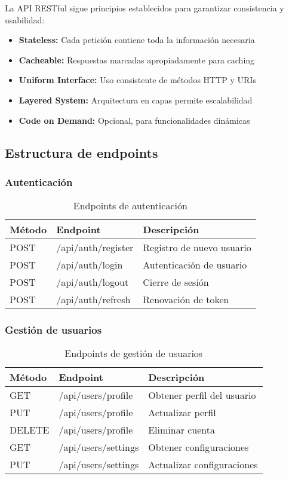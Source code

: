 La API RESTful sigue principios establecidos para garantizar consistencia y usabilidad:

\begin{itemize}
    \item \textbf{Stateless:} Cada petición contiene toda la información necesaria
    \item \textbf{Cacheable:} Respuestas marcadas apropiadamente para caching
    \item \textbf{Uniform Interface:} Uso consistente de métodos HTTP y URIs
    \item \textbf{Layered System:} Arquitectura en capas permite escalabilidad
    \item \textbf{Code on Demand:} Opcional, para funcionalidades dinámicas
\end{itemize}

\subsection{Estructura de endpoints}

\subsubsection{Autenticación}

\begin{table}[H]
\centering
\begin{tabular}{|l|l|l|}
\hline
\textbf{Método} & \textbf{Endpoint} & \textbf{Descripción} \\
\hline
POST & /api/auth/register & Registro de nuevo usuario \\
POST & /api/auth/login & Autenticación de usuario \\
POST & /api/auth/logout & Cierre de sesión \\
POST & /api/auth/refresh & Renovación de token \\
\hline
\end{tabular}
\caption{Endpoints de autenticación}
\label{tab:endpoints_auth}
\end{table}

\subsubsection{Gestión de usuarios}

\begin{table}[H]
\centering
\begin{tabular}{|l|l|l|}
\hline
\textbf{Método} & \textbf{Endpoint} & \textbf{Descripción} \\
\hline
GET & /api/users/profile & Obtener perfil del usuario \\
PUT & /api/users/profile & Actualizar perfil \\
DELETE & /api/users/profile & Eliminar cuenta \\
GET & /api/users/settings & Obtener configuraciones \\
PUT & /api/users/settings & Actualizar configuraciones \\
\hline
\end{tabular}
\caption{Endpoints de gestión de usuarios}
\label{tab:endpoints_users}
\end{table}


